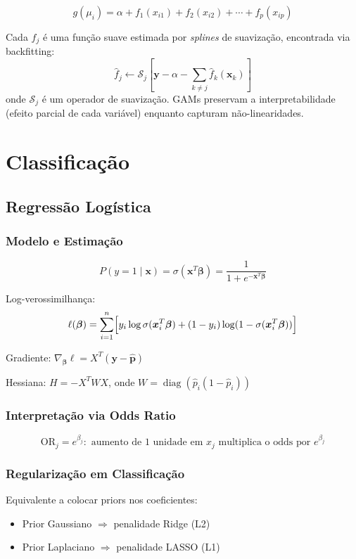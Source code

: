 \documentclass[12pt,a4paper,twoside]{book}
\theoremstyle{definition}
\theoremstyle{remark}
\newcommand{\bx}{\bm{x}}
\newcommand{\by}{\bm{y}}
\newcommand{\bbeta}{\bm{\beta}}
\DeclareMathOperator{\diag}{diag}
\begin{document}
\[
g(\mu_i) = \alpha + f_1(x_{i1}) + f_2(x_{i2}) + \cdots + f_p(x_{ip})
\]

Cada $f_j$ é uma função suave estimada por \textit{splines} de suavização, encontrada via backfitting:
\[
\hat{f}_j \leftarrow \mathcal{S}_j\!\left[\by - \alpha - \sum_{k \neq j} \hat{f}_k(\bm{x}_k)\right]
\]
onde $\mathcal{S}_j$ é um operador de suavização. GAMs preservam a interpretabilidade (efeito parcial de cada variável) enquanto capturam não-linearidades.

\chapter{Classificação}

\section{Regressão Logística}

\subsection{Modelo e Estimação}

\[
P(y=1 \mid \bx) = \sigma(\bx^T\bbeta) = \frac{1}{1+e^{-\bx^T\bbeta}}
\]

Log-verossimilhança:
\[
\ell(\bbeta) = \sum_{i=1}^n \Bigl[y_i \log\sigma(\bx_i^T\bbeta) + (1-y_i)\log(1-\sigma(\bx_i^T\bbeta))\Bigr]
\]

Gradiente: $\nabla_\bbeta \ell = X^T(\by - \hat{\bm{p}})$

Hessiana: $H = -X^T W X$, onde $W = \diag(\hat{p}_i(1-\hat{p}_i))$

\subsection{Interpretação via Odds Ratio}

\[
\mathrm{OR}_j = e^{\beta_j}: \text{ aumento de 1 unidade em } x_j \text{ multiplica o odds por } e^{\beta_j}
\]

\subsection{Regularização em Classificação}

Equivalente a colocar priors nos coeficientes:
\begin{itemize}
  \item Prior Gaussiano $\Rightarrow$ penalidade Ridge (L2)
  \item Prior Laplaciano $\Rightarrow$ penalidade LASSO (L1)
\end{itemize}
\end{document}
